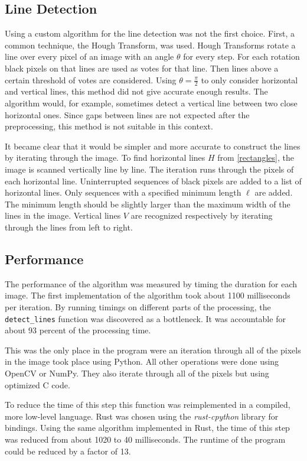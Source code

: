 \documentclass[serif,article,noparskip]{agse-thesis}
\begin{document}
\subsection{Line Detection} \label{linedetection}

Using a custom algorithm for the line detection was not the first choice. First, a common technique, the Hough Transform, was used. Hough Transforms rotate a
line over every pixel of an image with an angle $\theta$ for every step. For
each rotation black pixels on that lines are used as votes for that line. Then
lines above a certain threshold of votes are considered. Using $\theta =
\frac{\pi}{2}$ to only consider horizontal and vertical lines, this method did
not give accurate enough results. The algorithm would, for example, sometimes
detect a vertical line between two close horizontal ones. Since gaps between
lines are not expected after the preprocessing, this method is not suitable
in this context.

It became clear that it would be simpler and more accurate to construct the
lines by iterating through the image. To find horizontal lines $H$ from
\ref{rectangles}, the image is scanned vertically line by line. The
iteration runs through the pixels of each horizontal line. Uninterrupted
sequences of black pixels are added to a list of horizontal lines. Only
sequences with a specified minimum length $\ell$ are added. The minimum length
should be slightly larger than the maximum width of the lines in the image.
Vertical lines $V$ are recognized respectively by iterating through the lines
from left to right.

\subsection{Performance} \label{performance}

The performance of the algorithm was measured by timing the duration for each
image. The first implementation of the algorithm took about 1100 milliseconds per
iteration. By running timings on different parts of the processing, the
\texttt{detect\_lines} function was discovered as a bottleneck. It was
accountable for about 93 percent of the processing time.

This was the only place in the program were an iteration through all of the
pixels in the image took place using Python. All other operations were done
using OpenCV or NumPy. They also iterate through all of the pixels but using
optimized C code.

To reduce the time of this step this function was reimplemented in a compiled,
more low-level language. Rust was chosen using the \textit{rust-cpython} library
for bindings. Using the same algorithm implemented in Rust, the time of this
step was reduced from about 1020 to 40 milliseconds. The runtime of the program
could be reduced by a factor of 13.
\end{document}
